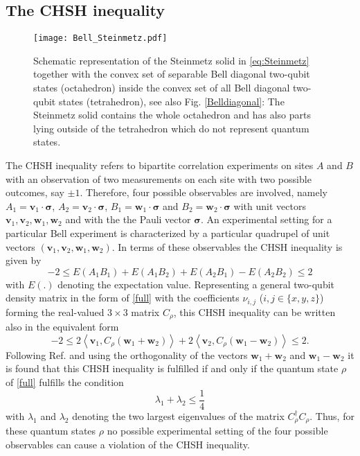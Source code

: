 \documentclass[12pt]{iopart}
\begin{document}
\subsection{The CHSH inequality}
\label{sec:CHSH}

\begin{figure}[t!]
   \centering
  \texttt{[image: Bell\_Steinmetz.pdf]}
     \caption{Schematic representation of the Steinmetz solid in \eqref{eq:Steinmetz} together with the convex set of separable Bell diagonal two-qubit states (octahedron) inside  
     the convex set of all Bell diagonal two-qubit states (tetrahedron), see also Fig. \ref{Belldiagonal}: The Steinmetz solid contains the whole octahedron and has also parts lying outside of the tetrahedron which do not represent
quantum states.}
   \label{Steinmetz}
 \end{figure}

The CHSH inequality refers to bipartite correlation experiments on sites $A$ and $B$ with an observation of two measurements on each site with two possible 
outcomes, say $\pm 1$. Therefore, four possible observables are involved, namely $A_1=\bm{v}_1 \cdot \bm{\sigma}$, $A_2=\bm{v}_2 \cdot \bm{\sigma}$, $B_1=\bm{w}_1 \cdot \bm{\sigma}$ and 
$B_2=\bm{w}_2 \cdot \bm{\sigma}$ with unit vectors $\bm{v}_1,\bm{v}_2,\bm{w}_1,\bm{w}_2$ and with the the Pauli vector $\bm{\sigma}$. An experimental setting for a particular Bell experiment is characterized by a particular quadrupel of unit vectors $(\bm{v}_1,\bm{v}_2,\bm{w}_1,\bm{w}_2)$. In terms of these observables the CHSH inequality is given by
\begin{equation}\label{CHSH}
 -2 \leqslant E(A_1B_1)+E(A_1B_2)+E(A_2B_1)-E(A_2B_2)\leqslant 2
\end{equation}
with $E(.)$ denoting the expectation value. 
Representing  a general two-qubit density matrix in the form of  \eqref{full} with the coefficients $\nu_{i,j}$ ($i,j \in \{x,y,z\}$) forming the real-valued $3 \times 3$ 
matrix $C_{\rho}$, this CHSH inequality can be written also in the equivalent form 
\begin{equation}
  -2 \leqslant 2 \left\langle \bm{v}_1, C_{\rho} \left(\bm{w}_1 +\bm{w}_2 \right) \right\rangle +  2 \left\langle \bm{v}_2, C_{\rho} \left(\bm{w}_1 -\bm{w}_2 \right) \right\rangle \leqslant 2.
\end{equation}
Following Ref. \cite{Horodecki95} and using the orthogonality of the vectors $\bm{w}_1 +\bm{w}_2$ and $\bm{w}_1 -\bm{w}_2$
 it is found that this CHSH inequality is fulfilled if and only if the  quantum state $\rho$ of \eqref{full}  fulfills the condition
\begin{equation}\label{CHSHcond}
 \lambda_1 + \lambda_2 \leqslant \frac{1}{4}
\end{equation}
with $\lambda_1$ and $\lambda_2$ denoting the two largest eigenvalues of the matrix $C^\dagger_{\rho} C_{\rho}$. Thus, for these quantum states $\rho$ no possible experimental setting of the four possible observables can cause a violation of the CHSH inequality.
\end{document}
